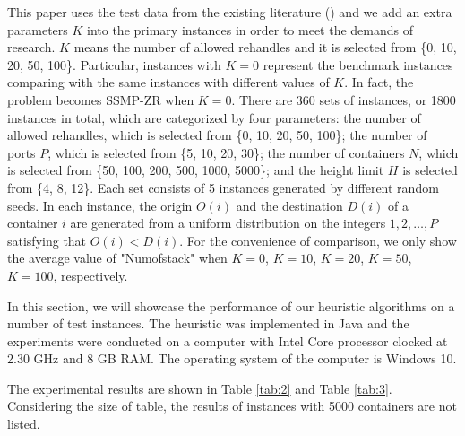\documentclass[review,3p,times,authoryear,12pt]{elsarticle}
\begin{document}
This paper uses the test data from the existing literature (\cite{wang2014stowage}) and we add an extra parameters $K$ into the primary instances in order to meet the demands of research.
$K$ means the number of allowed rehandles and it is selected from \{0, 10, 20, 50, 100\}.
Particular, instances with $K=0$ represent the benchmark instances comparing with the same instances with different values of $K$.
In fact, the problem becomes SSMP-ZR when $K=0$.
There are 360 sets of instances, or 1800 instances in total, which are categorized by four parameters: the number of allowed rehandles, which is selected from \{0, 10, 20, 50, 100\};
the number of ports $P$, which is selected from \{5, 10, 20, 30\};
the number of containers $N$, which is selected from \{50, 100, 200, 500, 1000, 5000\};
and the height limit $H$ is selected from \{4, 8, 12\}.
Each set consists of 5 instances generated by different random seeds.
In each instance, the origin $O(i)$ and the destination $D(i)$ of a container $i$ are generated from a uniform distribution on the integers $1, 2, \ldots, P$ satisfying that $O(i)<D(i)$.
For the convenience of comparison, we only show the average value of "Numofstack" when $K=0$, $K=10$, $K=20$, $K=50$, $K=100$, respectively.

In this section, we will showcase the performance of our heuristic algorithms on a number of test instances.
The heuristic was implemented in Java and the experiments were conducted on a computer with Intel Core processor clocked at 2.30 GHz and 8 GB RAM.
The operating system of the computer is Windows 10.

The experimental results are shown in Table \ref{tab:2} and Table \ref{tab:3}.
Considering the size of table, the results of instances with 5000 containers are not listed.
\end{document}
